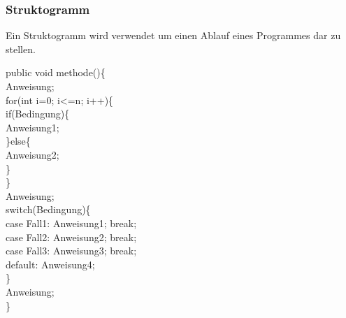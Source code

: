 \documentclass[12pt,a4paper]{article}
\begin{document}
\subsubsection{Struktogramm}
    Ein Struktogramm wird verwendet um einen Ablauf eines Programmes dar zu stellen.
    \begin{center}
    	\begin{minipage}{.4\textwidth}
        \color{gray}
        public void methode()\{\\
        \hspace*{0.5cm}Anweisung;\\
        \hspace*{0.5cm}for(int i=0; i<=n; i++)\{\\
        \hspace*{1cm}if(Bedingung)\{\\
        \hspace*{1.5cm}Anweisung1;\\
        \hspace*{1cm}\}else\{\\
        \hspace*{1.5cm}Anweisung2;\\
        \hspace*{1cm}\}\\
        \hspace*{0.5cm}\}\\
        \hspace*{0.5cm}Anweisung;\\
        \hspace*{0.5cm}switch(Bedingung)\{\\
        \hspace*{1cm}case Fall1: Anweisung1; break;\\
        \hspace*{1cm}case Fall2: Anweisung2; break;\\
        \hspace*{1cm}case Fall3: Anweisung3; break;\\
        \hspace*{1cm}default: Anweisung4;\\
        \hspace*{0.5cm}\}\\
        \hspace*{0.5cm}Anweisung;\\
        \}\\
    \end{minipage}
    \begin{minipage}{.5\textwidth}

\end{minipage}
\end{center}
\end{document}
